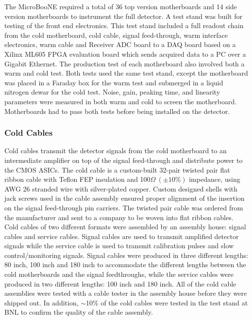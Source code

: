 The MicroBooNE \lartpc required a total of 36 top version motherboards and 14 side version motherboards to instrument the full detector. A test stand was built for testing of the front end electronics. This test stand included a full readout chain from the cold motherboard, cold cable, signal feed-through, warm interface electronics, warm cable and Receiver ADC board to a DAQ board based on a Xilinx ML605 FPGA evaluation board which sends acquired data to a PC over a Gigabit Ethernet. The production test of each motherboard also involved both a warm and cold test. Both tests used the same test stand, except the motherboard was placed in a Faraday box for the warm test and submerged in a liquid nitrogen dewar for the cold test. Noise, gain, peaking time, and linearity parameters were measured in both warm and cold to screen the motherboard. Motherboards had to pass both tests  before being installed on the detector.

\subsubsection{Cold Cables}

Cold cables transmit the detector signals from the cold motherboard to an intermediate amplifier on top of the signal feed-through and distribute power to the CMOS ASICs. The cold cable is a custom-built 32-pair twisted pair flat ribbon cable with Teflon FEP insulation and 100$\Omega~(\pm10\%)$ impedance, using AWG 26 stranded wire with silver-plated copper. Custom designed shells with jack screws used in the cable assembly ensured proper alignment of the insertion on the signal feed-through pin carriers. The twisted pair cable was ordered from the manufacturer and sent to a company to be woven into flat ribbon cables.  Cold cables of two different formats were assembled by an assembly house: signal cables and service cables. Signal cables are used to transmit amplified detector signals while the service cable is used to transmit calibration pulses and slow control/monitoring signals. Signal cables were produced in three different lengths: 80 inch, 100 inch and 180 inch to accommodate the different lengths between the cold motherboards and the signal feedthroughs, while the service cables were produced in two different lengths: 100 inch and 180 inch. All of the cold cable assemblies were tested with a cable tester in the assembly house before they were shipped out. In addition, $\sim$10\% of the cold cables were tested in the test stand at BNL to confirm the quality of the cable assembly. 


